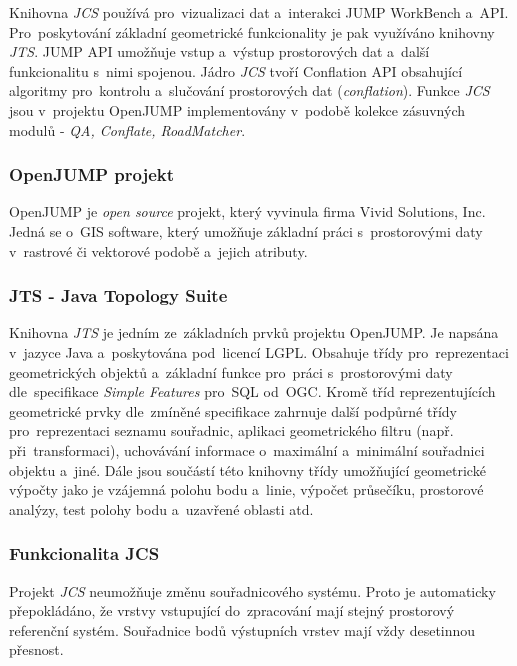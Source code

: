 Knihovna \textit{JCS} používá pro~vizualizaci dat a~interakci JUMP WorkBench
a~API. Pro~poskytování základní geometrické funkcionality je pak využíváno 
knihovny \textit{JTS}. JUMP API umožňuje vstup a~výstup prostorových dat 
a~další funkcionalitu s~nimi spojenou. Jádro \textit{JCS} tvoří Conflation API
obsahující algoritmy pro~kontrolu a~slučo\-vání prostorových dat 
(\textit{conflation}). Funkce \textit{JCS} jsou v~projektu OpenJUMP 
implementovány v~podobě kolekce zásuvných modulů - \textit{QA, Conflate, 
RoadMatcher}.

\subsubsection{OpenJUMP projekt}

OpenJUMP je \textit{open source} projekt, který vyvinula firma Vivid Solutions,
Inc. Jedná se o~GIS software, který umožňuje základní práci 
s~prostorovými daty v~rastrové či vektorové podobě a~jejich atributy.

\subsubsection{JTS - Java Topology Suite}
\label{kap:jts}

Knihovna \textit{JTS} je jedním ze~základních prvků projektu OpenJUMP.
Je napsána v~jazyce Java a~poskytována pod~licencí LGPL. Obsahuje třídy 
pro~reprezentaci geometrických objektů a~základní funkce pro~práci 
s~prostorovými daty dle~specifikace \textit{Simple Features} pro~SQL 
od~OGC. Kromě tříd reprezentujících geometrické prvky dle~zmíněné
specifikace zahrnuje další podpůrné třídy pro~reprezentaci seznamu souřadnic,
aplikaci geometrického filtru (např. při~transformaci), uchovávání informace
o~maximální a~minimální souřadnici objektu a~jiné. Dále jsou součástí této 
knihovny třídy umožňující geometrické výpočty jako je vzájemná polohu bodu 
a~linie, výpočet průsečíku, prostorové analýzy, test polohy bodu a~uzavřené
oblasti atd. 

\subsubsection{Funkcionalita JCS} %

Projekt \textit{JCS} neumožňuje změnu souřadnicového systému. Proto je
automaticky přepokládáno, že vrstvy vstupující do~zpracování mají stejný
prostorový referenční systém. Souřadnice bodů výstupních vrstev mají vždy
desetinnou přesnost.  %

